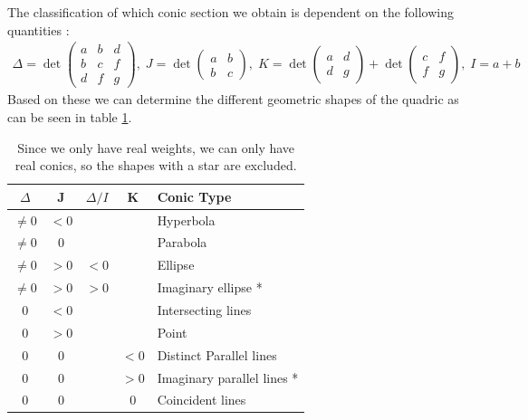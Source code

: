 The classification of which conic section we obtain is dependent on the following quantities \cite{Zwillinger2002}:
\begin{align*}
    \Delta = \det
    \begin{pmatrix}
    a & b & d \\
    b & c & f\\
    d & f & g
    \end{pmatrix}, \;
    J = \det
    \begin{pmatrix}
    a & b \\
    b & c 
    \end{pmatrix}, \;
    K = \det
    \begin{pmatrix}
    a & d \\
    d & g 
    \end{pmatrix} + \det
    \begin{pmatrix}
    c & f \\
    f & g 
    \end{pmatrix},\; I = a + b
\end{align*}
Based on these we can determine the different geometric shapes of the quadric as can be seen in table \ref{tab:conics}.
\begin{table}[ht!]
    \centering
    \caption{Since we only have real weights, we can only have real conics, so the shapes with a star are excluded.}
    \begin{tabular}{|c | c | c| c |l|}
         \hline $\Delta$ & J & $\Delta / I$ & K & Conic Type\\\hline
         $\neq 0$ & $<0$ & & & Hyperbola \\
         $\neq 0$ & $0$ & & & Parabola\\
         $\neq 0$ & $>0$ & $<0$ & &  Ellipse\\
         $\neq 0$ & $>0$ &  $>0$ & & Imaginary ellipse *\\
         $0$ & $<0$ & & & Intersecting lines\\
         $0$ & $>0$ & & &  Point\\
         $0$ & $0$ & & $<0$ & Distinct Parallel lines \\
         $0$ & $0$ & & $>0$ & Imaginary parallel lines *\\
         $0$ & $0$ & & $0$ & Coincident lines \\\hline
    \end{tabular}
    \label{tab:conics}
\end{table}

